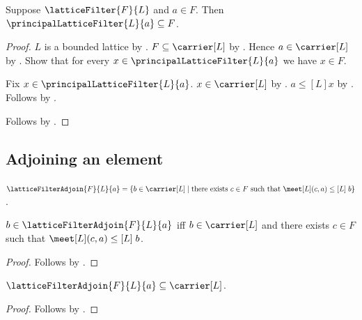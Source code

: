 \begin{theorem}\label{principal_lattice_filter_least}
    Suppose $\latticeFilter{F}{L}$ and $a\in F$.
    Then $\principalLatticeFilter{L}{a}\subseteq F$.
\end{theorem}
\begin{proof}
    $L$ is a bounded lattice by .
    $F\subseteq\carrier[L]$ by
        .
    Hence $a\in\carrier[L]$ by .
    Show that for every $x\in\principalLatticeFilter{L}{a}$ we have
        $x\in F$.
    \begin{subproof}
        Fix $x\in\principalLatticeFilter{L}{a}$.
        $x\in\carrier[L]$ by
            .
        $a\mathrel{\leq[L]}x$ by
            .
        Follows by .
    \end{subproof}
    Follows by .
\end{proof}

\subsection{Adjoining an element}

\begin{definition}\label{lattice_filter_adjoin}
    $\latticeFilterAdjoin{F}{L}{a}=
        \{b\in\carrier[L]\mid
            \text{there exists $c\in F$ such that
                $\meet[L](c,a)\mathrel{\leq[L]}b$}\}$.
\end{definition}

\begin{proposition}\label{lattice_filter_adjoin_iff}
    $b\in\latticeFilterAdjoin{F}{L}{a}$ iff
        $b\in\carrier[L]$ and
        there exists $c\in F$ such that
            $\meet[L](c,a)\mathrel{\leq[L]}b$.
\end{proposition}
\begin{proof}
    Follows by .
\end{proof}

\begin{proposition}\label{lattice_filter_adjoin_subseteq_carrier}
    $\latticeFilterAdjoin{F}{L}{a}\subseteq\carrier[L]$.
\end{proposition}
\begin{proof}
    Follows by .
\end{proof}

